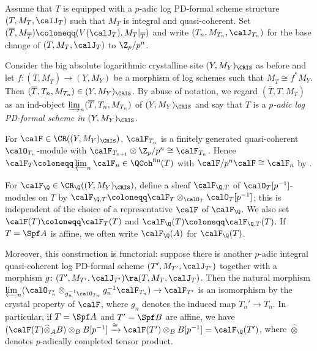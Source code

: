\begin{construction}\label{construction: eval of isocrystal at log PD-formal scheme}
Assume that $T$ is equipped with a $p$-adic log PD-formal scheme structure $(T,M_{T}, \calJ_{T})$ such that $M_T$ is integral and quasi-coherent. Set $(\overline{T},M_{\overline{T}})\coloneqq (V(\calJ_{T}),M_{T}|_{\overline{T}})$ and write $(T_n,M_{T_n},\calJ_{T_n})$ for the base change of $(T,M_{T}, \calJ_{T})$ to $\Z_p/p^n$.

Consider the big absolute logarithmic crystalline site $(Y,M_Y)_\CRIS$ as before and let $f\colon (\overline{T},M_{\overline{T}})\rightarrow (Y,M_Y)$ be a morphism of log schemes such that $M_{\overline{T}}\cong f^\ast M_Y$. Then $(\overline{T},T_n,M_{T_n})\in (Y,M_Y)_\CRIS$. By abuse of notation, we regard $(\overline{T},T,M_{T})$ as an ind-object $\varinjlim_n (\overline{T},T_n,M_{T_n})$ of $(Y,M_Y)_\CRIS$ and say that $T$ is a \emph{$p$-adic log PD-formal scheme in $(Y,M_Y)_\CRIS$}.

For $\calF\in \CR((Y,M_Y)_\CRIS)$, $\calF_{T_n}$ is a finitely generated quasi-coherent $\calO_{T_n}$-module with $\calF_{T_{n+1}}\otimes \Z_p/p^n\cong\calF_{T_n}$. Hence $\calF_T\coloneqq \varprojlim_n\calF_n\in \QCoh^{\mathrm{fin}}(T)$ with $\calF/p^n\calF\cong \calF_n$ by \cite[Prop.~I.3.4.1]{fujiwara-kato}.


For $\calF_\Q\in \CR_\Q((Y,M_Y)_\CRIS)$, define a sheaf $\calF_{\Q,T}$ of $\calO_{T}[p^{-1}]$-modules on $T$ by $\calF_{\Q,T}\coloneqq \calF_{T}\otimes_{\calO_{T}}\calO_{T}[p^{-1}]$; this is independent of the choice of a representative $\calF$ of $\calF_\Q$. We also set $\calF(T)\coloneqq \calF_{T}(T)$ and $\calF_{\Q}(T)\coloneqq \calF_{\Q,T}(T)$. If $T=\Spf A$ is affine, we often write $\calF_\Q(A)$ for $\calF_\Q(T)$.


Moreover, this construction is functorial: suppose there is another $p$-adic integral quasi-coherent log PD-formal scheme $(T',M_{T'},\calJ_{T'})$ together with a morphism $g\colon (T',M_{T'},\calJ_{T'})\ra (T,M_{T},\calJ_{T})$. Then the natural morphism
$\varprojlim_n (\calO_{T_n'}\otimes_{g_n^{-1}\calO_{T_n}}g_n^{-1}\calF_{T_n})\rightarrow \calF_{T'}$
is an isomorphism by the crystal property of $\calF$, where $g_n$ denotes the induced map $T_n'\rightarrow T_n$. In particular, if $T=\Spf A$ and $T'=\Spf B$ are affine, we have $(\calF(T)\widehat{\otimes}_AB)\otimes_BB[p^{-1}]\xrightarrow{\cong}\calF(T')\otimes_BB[p^{-1}]=\calF_\Q(T')$, where $\widehat{\otimes}$ denotes $p$-adically completed tensor product.
\end{construction}

